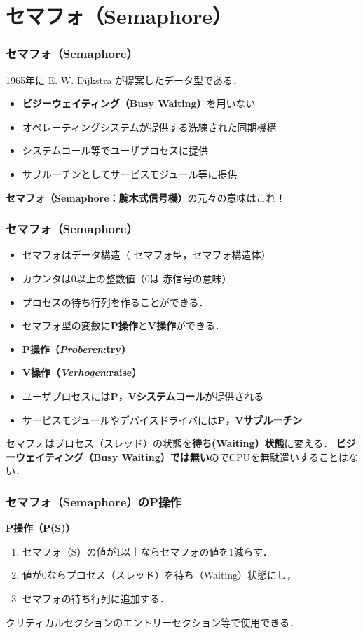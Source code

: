 \documentclass{beamer}                   %
\begin{document}
\section{セマフォ（Semaphore）}
\begin{frame}
  \frametitle{セマフォ（Semaphore）}
  1965年に E. W. Dijkstra が提案したデータ型である．
  \begin{itemize}
  \item {\bf ビジーウェイティング（Busy Waiting）}を用いない
  \item オペレーティングシステムが提供する洗練された同期機構
  \item システムコール等でユーザプロセスに提供
  \item サブルーチンとしてサービスモジュール等に提供
  \end{itemize}

{\bf セマフォ（Semaphore：腕木式信号機）}の元々の意味はこれ！

\end{frame}

\begin{frame}
  \frametitle{セマフォ（Semaphore）}
  \begin{itemize}
  \item セマフォはデータ構造（{\color{red} セマフォ型}，セマフォ構造体）
  \item カウンタは0以上の整数値（0は{\color{red} 赤信号}の意味）
  \item プロセスの待ち行列を作ることができる．
  \item セマフォ型の変数に{\bf P操作}と{\bf V操作}ができる．
  \item {\bf P操作（{\it Proberen}:try）}
  \item {\bf V操作（{\it Verhogen}:raise）}
  \item ユーザプロセスには{\bf P，Vシステムコール}が提供される
  \item サービスモジュールやデバイスドライバには{\bf P，Vサブルーチン}
  \end{itemize}

セマフォはプロセス（スレッド）の状態を{\bf 待ち(Waiting）状態}に変える．
{\bf ビジーウェイティング（Busy Waiting）では無い}のでCPUを無駄遣いすることはない．
\end{frame}

\begin{frame}
  \frametitle{セマフォ（Semaphore）のP操作}
  {\bf P操作（P(S)）}
  \begin{enumerate}
  \item セマフォ（S）の値が1以上ならセマフォの値を1減らす．
  \item 値が0ならプロセス（スレッド）を待ち（Waiting）状態にし，
  \item セマフォの待ち行列に追加する．
  \end{enumerate}
  クリティカルセクションのエントリーセクション等で使用できる．

  \begin{center}
    \begin{minipage}{0.6\columnwidth}
    \end{minipage}
  \end{center}
\end{frame}
\end{document}
